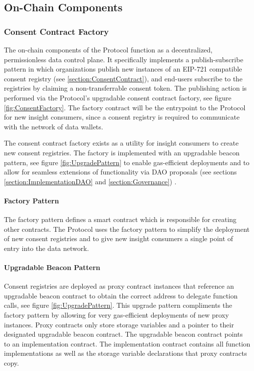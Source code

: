 \subsection{On-Chain Components}
\label{section:OnChain}

\subsubsection{Consent Contract Factory}
\label{section:ConsentFactory}


The on-chain components of the Protocol function as a decentralized, permissionless data control plane. It specifically implements a publish-subscribe pattern
in which organizations publish new instances of an EIP-721 compatible consent registry (see \ref{section:ConsentContract}), and end-users 
subscribe to the registries by claiming a non-transferrable consent token. The publishing action is performed via the Protocol's upgradable 
consent contract factory, see figure \ref{fig:ConsentFactory}. The factory contract will be the entrypoint to the Protocol for new insight 
consumers, since a consent registry is required to communicate with the network of data wallets. 


The consent contract factory exists as a utility for insight consumers to create new consent registries. The factory is implemented with an 
upgradable beacon pattern, see figure \ref{fig:UpgradePattern} to enable gas-efficient deployments and to allow for seamless extensions of functionality
via DAO proposals (see sections \ref{section:ImplementationDAO} and \ref{section:Governance}) . 

\paragraph{Factory Pattern}
The factory pattern defines a smart contract which is responsible for creating other contracts. The Protocol uses the factory 
pattern to simplify the deployment of new consent registries and to give new insight consumers a single point of entry into the data network. 

\paragraph{Upgradable Beacon Pattern}
\label{section:BeaconPattern}

Consent registries are deployed as proxy contract instances that reference an upgradable beacon contract to obtain the correct address to delegate
function calls, see figure \ref{fig:UpgradePattern}. This upgrade pattern compliments the factory pattern by allowing for very gas-efficient deployments 
of new proxy instances. Proxy contracts only store storage variables and a pointer to their designated upgradable beacon contract. The upgradable 
beacon contract points to an implementation contract. The implementation contract contains all function implementations as well as the storage
variable declarations that proxy contracts copy. 

